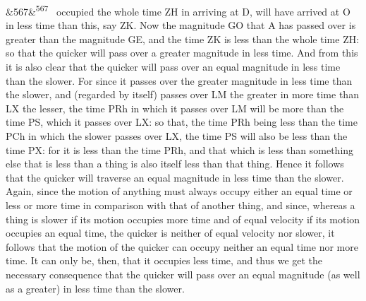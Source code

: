 \documentclass[12pt]{article}
\newcommand{\para}[1][]{\par\noindent\ifx&#1&\else\textsuperscript{\footnotesize #1}~\fi}
\begin{document}
\para[567] occupied the whole time ZH in arriving at D, will have arrived at O in less time than this, say ZK. Now the magnitude GO that A has passed over is greater than the magnitude GE, and the time ZK is less than the whole time ZH: so that the quicker will pass over a greater magnitude in less time. And from this it is also clear that the quicker will pass over an equal magnitude in less time than the slower. For since it passes over the greater magnitude in less time than the slower, and (regarded by itself) passes over LM the greater in more time than LX the lesser, the time PRh in which it passes over LM will be more than the time PS, which it passes over LX: so that, the time PRh being less than the time PCh in which the slower passes over LX, the time PS will also be less than the time PX: for it is less than the time PRh, and that which is less than something else that is less than a thing is also itself less than that thing. Hence it follows that the quicker will traverse an equal magnitude in less time than the slower. Again, since the motion of anything must always occupy either an equal time or less or more time in comparison with that of another thing, and since, whereas a thing is slower if its motion occupies more time and of equal velocity if its motion occupies an equal time, the quicker is neither of equal velocity nor slower, it follows that the motion of the quicker can occupy neither an equal time nor more time. It can only be, then, that it occupies less time, and thus we get the necessary consequence that the quicker will pass over an equal magnitude (as well as a greater) in less time than the slower.
\end{document}
